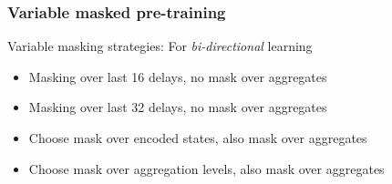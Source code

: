 \documentclass{beamer}
\begin{document}
\begin{frame}
\frametitle{Variable masked pre-training}

Variable masking strategies: For \emph{bi-directional} learning
\pause
\begin{itemize}
    \item<1-> Masking over last 16 delays, no mask over aggregates
    \item<1-> Masking over last 32 delays, no mask over aggregates 
    \pause
    \item<2-> Choose mask over encoded states,  also mask over aggregates
     \item<2-> Choose mask over aggregation levels,  also mask over aggregates
\end{itemize}


\end{frame}
\end{document}
